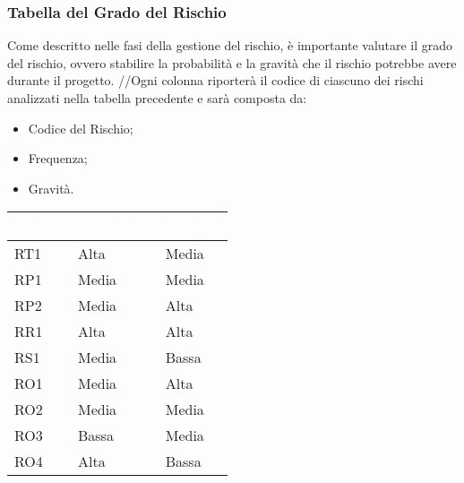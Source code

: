 \clearpage

\subsubsection{Tabella del Grado del Rischio}
Come descritto nelle fasi della gestione del rischio, è importante valutare il grado del rischio, ovvero stabilire la probabilità e la gravità che il rischio potrebbe avere durante il progetto.
//Ogni colonna riporterà il codice di ciascuno dei rischi analizzati nella tabella precedente e sarà composta da:
\begin{itemize}
	\item Codice del Rischio;
	\item Frequenza;
	\item Gravità.
\end{itemize}

{
\renewcommand{\arraystretch}{2}
\centering
	
\begin{longtable}{C{2cm} C{3cm} C{3cm}}
	\textcolor{white}{\textbf{Codice}} & 
	\textcolor{white}{\textbf{Frequenza}} & 
	\textcolor{white}{\textbf{Gravità}}\\	
\endhead
		
		RT1 & Alta & Media\\
		
		RP1 & Media & Media\\
		
		RP2 & Media & Alta\\
		
		RR1 & Alta & Alta \\
		
		RS1 & Media & Bassa \\
		
		RO1 & Media & Alta \\
		
		RO2 & Media & Media \\
		
		RO3 & Bassa & Media \\
		
		RO4 & Alta & Bassa \\
		
	
	\end{longtable}
	
}
